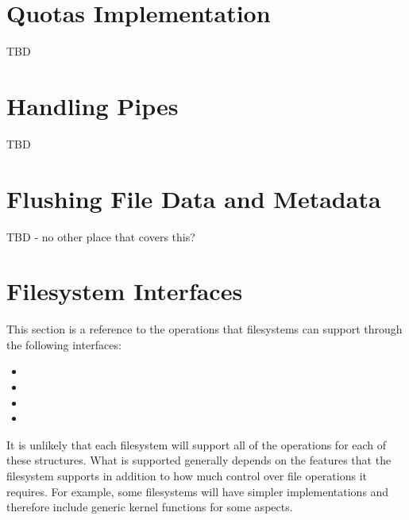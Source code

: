 
\section{Quotas Implementation}

TBD


\section{Handling Pipes}\label{vfs-pipes}

TBD


\section{Flushing File Data and Metadata}\label{vfs-sync}

TBD - no other place that covers this?



\section{Filesystem Interfaces}\label{vfs-operations}

This section is a reference to the operations that filesystems can support through the following interfaces:

\begin{itemize}
	\item {}
	\item {}
	\item {}
	\item {}

\end{itemize}

\noindent
It is unlikely that each filesystem will support all of the operations for each of these structures. What is supported generally depends on the features that the filesystem supports in addition to how much control over file operations it requires. For example, some filesystems will have simpler implementations and therefore include generic kernel functions for some aspects.

